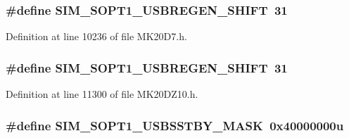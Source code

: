 \subsubsection[{\texorpdfstring{S\+I\+M\+\_\+\+S\+O\+P\+T1\+\_\+\+U\+S\+B\+R\+E\+G\+E\+N\+\_\+\+S\+H\+I\+FT}{SIM_SOPT1_USBREGEN_SHIFT}}]{\setlength{\rightskip}{0pt plus 5cm}\#define S\+I\+M\+\_\+\+S\+O\+P\+T1\+\_\+\+U\+S\+B\+R\+E\+G\+E\+N\+\_\+\+S\+H\+I\+FT~31}\hypertarget{group___s_i_m___register___masks_ga99e46c34c02e39338c9b80775bad09db}{}\label{group___s_i_m___register___masks_ga99e46c34c02e39338c9b80775bad09db}


Definition at line 10236 of file M\+K20\+D7.\+h.

\subsubsection[{\texorpdfstring{S\+I\+M\+\_\+\+S\+O\+P\+T1\+\_\+\+U\+S\+B\+R\+E\+G\+E\+N\+\_\+\+S\+H\+I\+FT}{SIM_SOPT1_USBREGEN_SHIFT}}]{\setlength{\rightskip}{0pt plus 5cm}\#define S\+I\+M\+\_\+\+S\+O\+P\+T1\+\_\+\+U\+S\+B\+R\+E\+G\+E\+N\+\_\+\+S\+H\+I\+FT~31}\hypertarget{group___s_i_m___register___masks_ga99e46c34c02e39338c9b80775bad09db}{}\label{group___s_i_m___register___masks_ga99e46c34c02e39338c9b80775bad09db}


Definition at line 11300 of file M\+K20\+D\+Z10.\+h.

\subsubsection[{\texorpdfstring{S\+I\+M\+\_\+\+S\+O\+P\+T1\+\_\+\+U\+S\+B\+S\+S\+T\+B\+Y\+\_\+\+M\+A\+SK}{SIM_SOPT1_USBSSTBY_MASK}}]{\setlength{\rightskip}{0pt plus 5cm}\#define S\+I\+M\+\_\+\+S\+O\+P\+T1\+\_\+\+U\+S\+B\+S\+S\+T\+B\+Y\+\_\+\+M\+A\+SK~0x40000000u}\hypertarget{group___s_i_m___register___masks_ga93a808f7a1d75e26bc3ed565ab257617}{}\label{group___s_i_m___register___masks_ga93a808f7a1d75e26bc3ed565ab257617}


